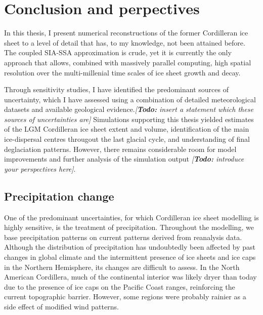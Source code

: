 \documentclass{article}
\newcommand{\todo}[1]{\emph{[\textbf{Todo:} #1]}}
\begin{document}
\section{Conclusion and perpectives}

In this thesis, I present numerical reconstructions of the former Cordilleran
ice sheet to a level of detail that has, to my knowledge, not been attained
before. The coupled SIA-SSA approximation is crude, yet it is currently the
only approach that allows, combined with massively parallel computing, high
spatial resolution over the multi-millenial time scales of ice sheet growth and
decay.

Through sensitivity studies, I have identified the predominant sources of
uncertainty, which I have assessed using a combination of detailed
meteorological datasets and available geological evidence.\todo{insert a
statement which these sources of uncertainties are} Simulations supporting this
thesis yielded estimates of the LGM Cordilleran ice sheet extent and volume,
identification of the main ice-dispersal centres througout the last glacial
cycle, and understanding of final deglaciation patterns. However, there remains
considerable room for model improvements and further analysis of the simulation
output \todo{introduce your perspectives here}.


\subsection{Precipitation change}

One of the predominant uncertainties, for which Cordilleran ice sheet modelling
is highly sensitive, is the treatment of precipitation. Throughout the
modelling, we base precipitation patterns on current patterns derived from
reanalysis data. Although the distribution of precipitation has undoubtedly
been affected by past changes in global climate and the intermittent presence
of ice sheets and ice caps in the Northern Hemisphere, its changes are
difficult to assess. In the North American Cordillera, much of the continental
interior was likely dryer than today due to the presence of ice caps on the
Pacific Coast ranges, reinforcing the current topographic barrier. However,
some regions were probably rainier as a side effect of modified wind patterns.
\end{document}
